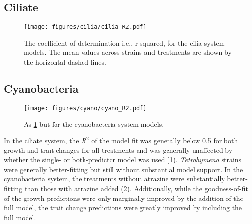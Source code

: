 \subsection{Ciliate}

\begin{figure}[H]
    \centering
    \texttt{[image: figures/cilia/cilia\_R2.pdf]}
    \caption{The coefficient of determination i.e., r-squared, for the cilia system models. The mean values across strains and treatments are shown by the horizontal dashed lines.}
    \label{fig:cilia_R2}
\end{figure}

\subsection{Cyanobacteria}

\begin{figure}[H]
    \centering
    \texttt{[image: figures/cyano/cyano\_R2.pdf]}
    \caption{As \cref{fig:cilia_R2} but for the cyanobacteria system models.}
    \label{fig:cyano_R2}
\end{figure}

In the ciliate system, the $R^2$ of the model fit was generally below 0.5 for both growth and trait changes for all treatments and was generally unaffected by whether the single- or both-predictor model was used (\cref{fig:cilia_R2}). \textit{Tetrahymena} strains were generally better-fitting but still without substantial model support. In the cyanobacteria system, the treatments without atrazine were substantially better-fitting than those with atrazine added (\cref{fig:cyano_R2}). Additionally, while the goodness-of-fit of the growth predictions were only marginally improved by the addition of the full model, the trait change predictions were greatly improved by including the full model.
